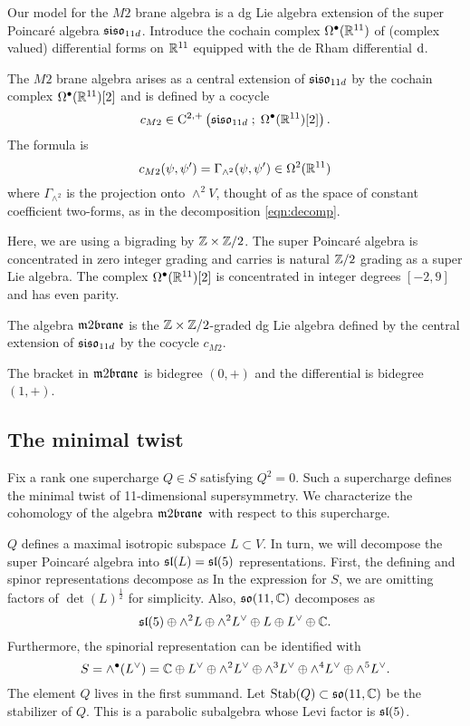Our model for the $M2$ brane algebra is a dg Lie algebra extension of the super Poincar\'e algebra $\mathfrak{siso}_{11d}$.
Introduce the cochain complex $\Omega^{\bullet}(\mathbb R^{11})$ of (complex valued) differential forms on $\mathbb R^{11}$ equipped with the de Rham differential ${\rm d}$.
 
The $M2$ brane algebra arises as a central extension of $\mathfrak{siso}_{11d}$ by the cochain complex $\Omega^\bullet(\mathbb R^{11})[2]$ and is defined by a cocycle
\[
    c_{M2} \in {\rm C}^{2,+} \left(\mathfrak{siso}_{11d} \; ; \; \Omega^\bullet (\mathbb R^{11})[2]\right) .
\]
The formula is
  \[c_{M2} (\psi, \psi') = \Gamma_{\wedge^2}(\psi, \psi') \in \Omega^2(\mathbb R^{11})\]
  where $\Gamma_{\wedge^2}$ is the projection onto $\wedge^2 V$, thought of as the space of constant coefficient two-forms, as in the decomposition \eqref{eqn:decomp}.
  
Here, we are using a bigrading by $\mathbb Z \times \mathbb Z/2$. 
The super Poincar\'e algebra is concentrated in zero integer grading and carries is natural $\mathbb Z/2$ grading as a super Lie algebra.
The complex $\Omega^{\bullet}(\mathbb R^{11})[2]$ is concentrated in integer degrees $[-2,9]$ and has even parity.

\begin{dfn}
The algebra $\m2$ is the $\mathbb Z \times \mathbb Z/2$-graded dg Lie algebra defined by the central extension of $\mathfrak{siso}_{11d}$ by the cocycle $c_{M2}$.  
\end{dfn}

The bracket in $\m2$ is bidegree $(0,+)$ and the differential is bidegree $(1,+)$.

\subsection{The minimal twist}
\label{sec:mintwist}

Fix a rank one supercharge $Q \in S$ satisfying $Q^2 = 0$.
Such a supercharge defines the minimal twist of 11-dimensional supersymmetry. 
We characterize the cohomology of the algebra $\m2$ with respect to this supercharge. 

$Q$ defines a maximal isotropic subspace $L \subset V$. 
In turn, we will decompose the super Poincar\'e algebra into $\mathfrak{sl}(L) = \mathfrak{sl}(5)$ representations.
First, the defining and spinor representations decompose as
In the expression for $S$, we are omitting factors of $\det(L)^{\frac12}$ for simplicity. 
Also, $\mathfrak{so}(11, \mathbb C)$ decomposes as
\[
\mathfrak{sl}(5) \oplus \wedge^2 L \oplus \wedge^2 L^\vee \oplus L \oplus L^\vee \oplus \mathbb{C} .
\]
Furthermore, the spinorial representation can be identified with
\[
S = \wedge^\bullet (L^\vee) = \mathbb C \oplus L^\vee \oplus \wedge^2 L^\vee \oplus \wedge^3 L^\vee \oplus \wedge^4 L^\vee \oplus \wedge^5 L^\vee .
\]
The element $Q$ lives in the first summand.
Let ${\rm Stab}(Q) \subset \mathfrak{so}(11,\mathbb C)$ be the stabilizer of $Q$. 
This is a parabolic subalgebra whose Levi factor is $\mathfrak{sl}(5)$.

